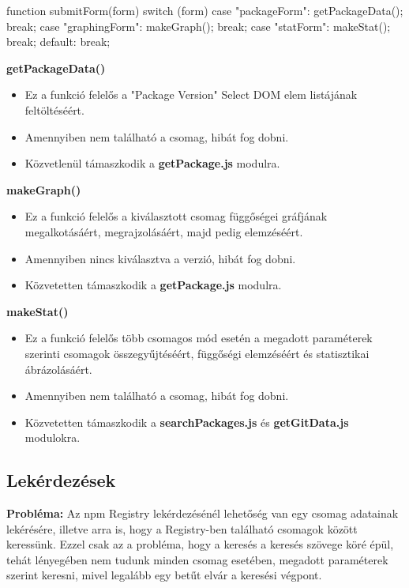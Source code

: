 \begin{js}
function submitForm(form){
	switch (form) {
		case "packageForm":
		getPackageData();
		break;
		case "graphingForm":
		makeGraph();
		break;
		case "statForm":
		makeStat();
		break;
		default:
		break;
	}
}
\end{js}

\noindent\textbf{getPackageData()}
\begin{itemize}
	\item Ez a funkció felelős a "Package Version" Select DOM elem listájának feltöltéséért. 
	\item Amennyiben nem található a csomag, hibát fog dobni.
	\item Közvetlenül támaszkodik a \textbf{getPackage.js} modulra.
\end{itemize}

\noindent\textbf{makeGraph()}
\begin{itemize}
	\item Ez a funkció felelős a kiválasztott csomag függőségei gráfjának megalkotásáért, megrajzolásáért, majd pedig elemzéséért.
	\item Amennyiben nincs kiválasztva a verzió, hibát fog dobni.
	\item Közvetetten támaszkodik a \textbf{getPackage.js} modulra.
\end{itemize}

\noindent\textbf{makeStat()}
\begin{itemize}
	\item Ez a funkció felelős több csomagos mód esetén a megadott paraméterek szerinti csomagok összegyűjtéséért, függőségi elemzéséért és statisztikai ábrázolásáért.
	\item Amennyiben nem található a csomag, hibát fog dobni.
	\item Közvetetten támaszkodik a \textbf{searchPackages.js} és \textbf{getGitData.js} modulokra.
\end{itemize}

\pagebreak

\subsection{Lekérdezések}

\textbf{Probléma:} Az npm Registry lekérdezésénél lehetőség van egy csomag adatainak lekérésére, illetve arra is, hogy a Registry-ben található csomagok között keressünk. Ezzel csak az a probléma, hogy a keresés a keresés szövege köré épül, tehát lényegében nem tudunk minden csomag esetében, megadott paraméterek szerint keresni, mivel legalább egy betűt elvár a keresési végpont.

